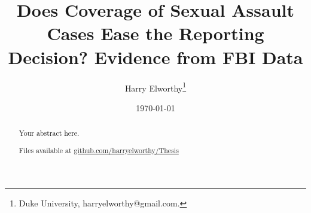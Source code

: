 \documentclass[AER,draftmode]{AEA}
\begin{document}
\title{Does Coverage of Sexual Assault Cases Ease the Reporting Decision? Evidence from FBI Data}
\author{Harry Elworthy\thanks{Duke University, harryelworthy@gmail.com.}}
\date{\today}
\pubMonth{}
\pubYear{}
\pubVolume{}
\pubIssue{}
\JEL{}
\Keywords{}

\begin{abstract}
Your abstract here.

Files available at \url{github.com/harryelworthy/Thesis}
\end{abstract}


\maketitle










\end{document}
